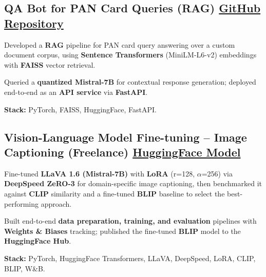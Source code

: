 \documentclass[letter,10pt]{article}
\begin{document}
\subsection{QA Bot for PAN Card Queries (RAG) \hfill \href{https://github.com/sunil448832/Natural-Language-Processing/tree/master/RAG(Retrieval\%20Augment\%20Generation)}{GitHub Repository}}
\begin{zitemize}
\item Developed a \textbf{RAG} pipeline for PAN card query answering over a custom document corpus, using \textbf{Sentence Transformers} (MiniLM-L6-v2) embeddings with \textbf{FAISS} vector retrieval.
\item Queried a \textbf{quantized Mistral-7B} for contextual response generation; deployed end-to-end as an \textbf{API service} via \textbf{FastAPI}.
\item \textbf{Stack:} PyTorch, FAISS, HuggingFace, FastAPI.
\end{zitemize}

\subsection{Vision-Language Model Fine-tuning – Image Captioning (Freelance) \hfill \href{https://huggingface.co/sunil448832/blip-model}{HuggingFace Model}}
\begin{zitemize}
\item Fine-tuned \textbf{LLaVA 1.6 (Mistral-7B)} with \textbf{LoRA} (r=128, $\alpha$=256) via \textbf{DeepSpeed ZeRO-3} for domain-specific image captioning, then benchmarked it against \textbf{CLIP} similarity and a fine-tuned \textbf{BLIP} baseline to select the best-performing approach.
\item Built end-to-end \textbf{data preparation, training, and evaluation} pipelines with \textbf{Weights \& Biases} tracking; published the fine-tuned \textbf{BLIP} model to the \textbf{HuggingFace Hub}.
\item \textbf{Stack:} PyTorch, HuggingFace Transformers, LLaVA, DeepSpeed, LoRA, CLIP, BLIP, W\&B.
\end{zitemize}
\end{document}
